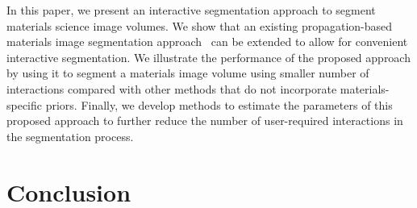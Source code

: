 \documentclass[]{spie}  %
\begin{document}
In this paper, we present an interactive segmentation approach to
segment materials science image volumes.  We show that an existing
propagation-based materials image segmentation
approach~\cite{waggoner:11} can be extended to allow for convenient
interactive segmentation.  We illustrate the performance of the
proposed approach by using it to segment a materials image volume
using smaller number of interactions compared with other methods that
do not incorporate materials-specific priors.  Finally, we develop
methods to estimate the parameters of this proposed approach to
further reduce the number of user-required interactions in the
segmentation process.

\section{Conclusion}
\label{sec:conclusion}


\end{document}
